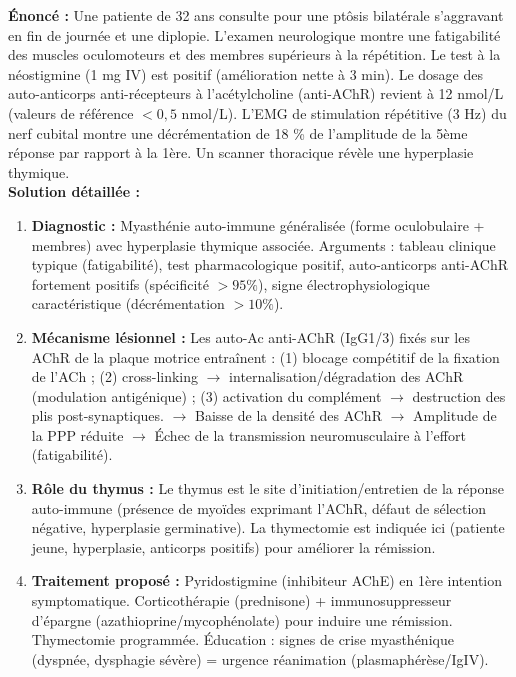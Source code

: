 \documentclass[11pt]{article}
\begin{document}
\begin{exoresolu}
\textbf{Énoncé :} Une patiente de 32 ans consulte pour une ptôsis bilatérale s'aggravant en fin de journée et une diplopie. L'examen neurologique montre une fatigabilité des muscles oculomoteurs et des membres supérieurs à la répétition. Le test à la néostigmine (1 mg IV) est positif (amélioration nette à 3 min). Le dosage des auto-anticorps anti-récepteurs à l'acétylcholine (anti-AChR) revient à 12 nmol/L (valeurs de référence $< 0,5$ nmol/L). L'EMG de stimulation répétitive (3 Hz) du nerf cubital montre une décrémentation de 18 \% de l'amplitude de la 5ème réponse par rapport à la 1ère. Un scanner thoracique révèle une hyperplasie thymique.
\\
\textbf{Solution détaillée :}
\begin{enumerate}
    \item \textbf{Diagnostic :} Myasthénie auto-immune généralisée (forme oculobulaire + membres) avec hyperplasie thymique associée. Arguments : tableau clinique typique (fatigabilité), test pharmacologique positif, auto-anticorps anti-AChR fortement positifs (spécificité $> 95\%$), signe électrophysiologique caractéristique (décrémentation $> 10\%$).
    \item \textbf{Mécanisme lésionnel :} Les auto-Ac anti-AChR (IgG1/3) fixés sur les AChR de la plaque motrice entraînent : (1) blocage compétitif de la fixation de l'ACh ; (2) cross-linking $\rightarrow$ internalisation/dégradation des AChR (modulation antigénique) ; (3) activation du complément $\rightarrow$ destruction des plis post-synaptiques. $\rightarrow$ Baisse de la densité des AChR $\rightarrow$ Amplitude de la PPP réduite $\rightarrow$ Échec de la transmission neuromusculaire à l'effort (fatigabilité).
    \item \textbf{Rôle du thymus :} Le thymus est le site d'initiation/entretien de la réponse auto-immune (présence de myoïdes exprimant l'AChR, défaut de sélection négative, hyperplasie germinative). La thymectomie est indiquée ici (patiente jeune, hyperplasie, anticorps positifs) pour améliorer la rémission.
    \item \textbf{Traitement proposé :} Pyridostigmine (inhibiteur AChE) en 1ère intention symptomatique. Corticothérapie (prednisone) + immunosuppresseur d'épargne (azathioprine/mycophénolate) pour induire une rémission. Thymectomie programmée. Éducation : signes de crise myasthénique (dyspnée, dysphagie sévère) = urgence réanimation (plasmaphérèse/IgIV).
\end{enumerate}
\end{exoresolu}
\end{document}
